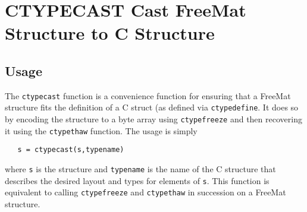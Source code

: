 \section{CTYPECAST Cast FreeMat Structure to C Structure}

\subsection{Usage}

The \verb|ctypecast| function is a convenience function for ensuring that
a FreeMat structure fits the definition of a C struct (as defined
via \verb|ctypedefine|.  It does so by encoding the structure
to a byte array using \verb|ctypefreeze| and then recovering it using
the \verb|ctypethaw| function.  The usage is simply
\begin{verbatim}
   s = ctypecast(s,typename)
\end{verbatim}
where \verb|s| is the structure and \verb|typename| is the name of the
C structure that describes the desired layout and types for elements
of \verb|s|.  This function is equivalent to calling \verb|ctypefreeze|
and \verb|ctypethaw| in succession on a FreeMat structure.
